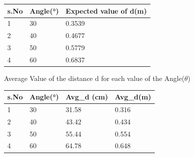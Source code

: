 \begin{center}
\begin{tabular}{|l|l|l|}
\hline
s.No & Angle(°) & Expected value of d(m) \\ \hline
1    & 30       & 0.3539                 \\ \hline
2    & 40       & 0.4677                 \\ \hline
3    & 50       & 0.5779                 \\ \hline
4    & 60       & 0.6837                 \\ \hline
\end{tabular}
\end{center}

Average Value of the distance d for each value of the Angle($\theta$)
\begin{center}
\begin{tabular}{|l|l|l|l|}
\hline
s.No & Angle(°) & Avg\_d (cm) & Avg\_d(m) \\ \hline
1    & 30       & 31.58       & 0.316     \\ \hline
2    & 40       & 43.42       & 0.434     \\ \hline
3    & 50       & 55.44       & 0.554     \\ \hline
4    & 60       & 64.78       & 0.648     \\ \hline
\end{tabular}
\end{center}

